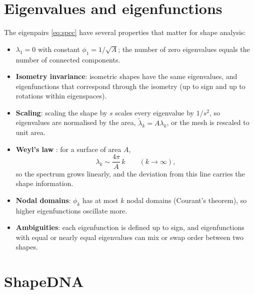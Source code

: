 \section{Eigenvalues and eigenfunctions}

The eigenpairs \eqref{eq:spec} have several properties that matter for shape analysis:
\begin{itemize}
  \item $\lambda_1=0$ with constant $\phi_1=1/\sqrt{A}$; the number of zero eigenvalues equals the
  number of connected components.
  \item \textbf{Isometry invariance}: isometric shapes have the same eigenvalues, and eigenfunctions
  that correspond through the isometry (up to sign and up to rotations within eigenspaces).
  \item \textbf{Scaling}: scaling the shape by $s$ scales every eigenvalue by $1/s^2$, so eigenvalues
  are normalised by the area, $\tilde\lambda_k=A\lambda_k$, or the mesh is rescaled to unit area.
  \item \textbf{Weyl's law} \citep{Weyl1911}: for a surface of area $A$,
  \begin{equation}
  \lambda_k\sim\frac{4\pi}{A}\,k\qquad(k\to\infty),
  \end{equation}
  so the spectrum grows linearly, and the deviation from this line carries the shape information.
  \item \textbf{Nodal domains}: $\phi_k$ has at most $k$ nodal domains (Courant's theorem), so higher
  eigenfunctions oscillate more.
  \item \textbf{Ambiguities}: each eigenfunction is defined up to sign, and eigenfunctions with equal
  or nearly equal eigenvalues can mix or swap order between two shapes.
\end{itemize}


\section{ShapeDNA}

